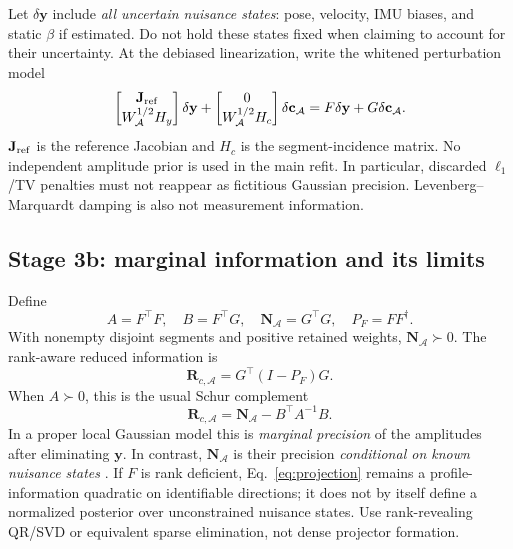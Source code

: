 \documentclass[conference]{IEEEtran}
\newcommand{\A}{\mathcal A}
\newcommand{\N}{\mathbf N}
\newcommand{\Rc}{\mathbf R}
\begin{document}
Let $\delta\mathbf y$ include \emph{all uncertain nuisance states}: pose, velocity, IMU biases, and static $\beta$ if estimated. Do not hold these states fixed when claiming to account for their uncertainty. At the debiased linearization, write the whitened perturbation model
\begin{equation}
 \begin{bmatrix}\mathbf J_{\rm ref}\\W_\A^{1/2}H_y\end{bmatrix}\delta\mathbf y
 +\begin{bmatrix}0\\W_\A^{1/2}H_c\end{bmatrix}\delta\mathbf c_\A
 =F\delta\mathbf y+G\delta\mathbf c_\A.
 \label{eq:fg}
\end{equation}
$\mathbf J_{\rm ref}$ is the reference Jacobian and $H_c$ is the segment-incidence matrix. No independent amplitude prior is used in the main refit. In particular, discarded $\ell_1$/TV penalties must not reappear as fictitious Gaussian precision. Levenberg--Marquardt damping is also not measurement information.

\subsection{Stage 3b: marginal information and its limits}
\label{sec:information}
Define
\begin{equation}
 A=F^\top F,\quad B=F^\top G,\quad
 \N_\A=G^\top G,\quad P_F=FF^\dagger.
 \label{eq:blocks}
\end{equation}
With nonempty disjoint segments and positive retained weights, $\N_\A\succ0$. The rank-aware reduced information is
\begin{equation}
 \boxed{\Rc_{c,\A}=G^\top(I-P_F)G.}
 \label{eq:projection}
\end{equation}
When $A\succ0$, this is the usual Schur complement
\begin{equation}
 \Rc_{c,\A}=\N_\A-B^\top A^{-1}B.
 \label{eq:schur}
\end{equation}
In a proper local Gaussian model this is \emph{marginal precision} of the amplitudes after eliminating $\mathbf y$. In contrast, $\N_\A$ is their precision \emph{conditional on known nuisance states} \cite{paskin2002}. If $F$ is rank deficient, Eq.~\eqref{eq:projection} remains a profile-information quadratic on identifiable directions; it does not by itself define a normalized posterior over unconstrained nuisance states. Use rank-revealing QR/SVD or equivalent sparse elimination, not dense projector formation.
\end{document}
